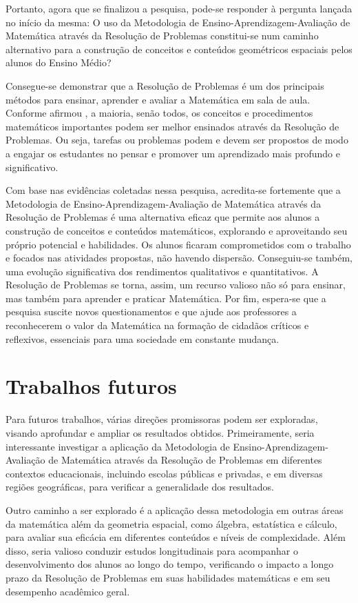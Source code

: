 Portanto, agora que se finalizou a pesquisa, pode-se responder à pergunta lançada no início da mesma: O uso da Metodologia de Ensino-Aprendizagem-Avaliação de Matemática através da Resolução de Problemas constitui-se num caminho alternativo para a construção de conceitos e conteúdos geométricos espaciais pelos alunos do Ensino Médio?

Consegue-se demonstrar que a Resolução de Problemas é um dos principais métodos para ensinar, aprender e avaliar a Matemática em sala de aula. Conforme afirmou , a maioria, senão todos, os conceitos e procedimentos matemáticos importantes podem ser melhor ensinados através da Resolução de Problemas. Ou seja, tarefas ou problemas podem e devem ser propostos de modo a engajar os estudantes no pensar e promover um aprendizado mais profundo e significativo.

Com base nas evidências coletadas nessa pesquisa, acredita-se fortemente que a Metodologia de Ensino-Aprendizagem-Avaliação de Matemática através da Resolução de Problemas é uma alternativa eficaz que permite aos alunos a construção de conceitos e conteúdos matemáticos, explorando e aproveitando seu próprio potencial e habilidades. Os alunos ficaram comprometidos com o trabalho e focados nas atividades propostas, não havendo dispersão. Conseguiu-se também, uma evolução significativa dos rendimentos qualitativos e quantitativos. A Resolução de Problemas se torna, assim, um recurso valioso não só para ensinar, mas também para aprender e praticar Matemática. Por fim, espera-se que a pesquisa suscite novos questionamentos e que ajude aos professores a reconhecerem o valor da Matemática na formação de cidadãos críticos e reflexivos, essenciais para uma sociedade em constante mudança.

\section{Trabalhos futuros}

Para futuros trabalhos, várias direções promissoras podem ser exploradas, visando aprofundar e ampliar os resultados obtidos. Primeiramente, seria interessante investigar a aplicação da Metodologia de Ensino-Aprendizagem-Avaliação de Matemática através da Resolução de Problemas em diferentes contextos educacionais, incluindo escolas públicas e privadas, e em diversas regiões geográficas, para verificar a generalidade dos resultados.

Outro caminho a ser explorado é a aplicação dessa metodologia em outras áreas da matemática além da geometria espacial, como álgebra, estatística e cálculo, para avaliar sua eficácia em diferentes conteúdos e níveis de complexidade. Além disso, seria valioso conduzir estudos longitudinais para acompanhar o desenvolvimento dos alunos ao longo do tempo, verificando o impacto a longo prazo da Resolução de Problemas em suas habilidades matemáticas e em seu desempenho acadêmico geral.

